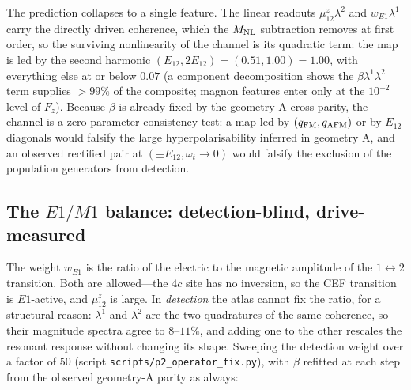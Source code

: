 \documentclass[11pt]{article}
\newcommand{\qafm}{q_{\rm AFM}}
\newcommand{\qfm}{q_{\rm FM}}
\newcommand{\Mnl}{M_{\rm NL}}
\begin{document}
The prediction collapses to a single feature.  The linear readouts
$\mu^z_{12}\lambda^2$ and $w_{E1}\lambda^1$ carry the directly driven
coherence, which the $\Mnl$ subtraction removes at first order, so the
surviving nonlinearity of the channel is its quadratic term: the map is
led by the second harmonic $(E_{12},2E_{12})=(0.51,1.00)=1.00$, with
everything else at or below $0.07$ (a component decomposition shows the
$\beta\lambda^1\lambda^2$ term supplies $>\!99\%$ of the composite;
magnon features enter only at the $10^{-2}$ level of $F_z$).  Because
$\beta$ is already fixed by the geometry-A cross parity, the channel is
a zero-parameter consistency test: a map led by $(\qfm,\qafm)$ or by
$E_{12}$ diagonals would falsify the large hyperpolarisability inferred
in geometry A, and an observed rectified pair at
$(\pm E_{12},\omega_t\!\to\!0)$ would falsify the exclusion of the
population generators from detection.

\subsection{The $E1/M1$ balance: detection-blind, drive-measured}
\label{si:e1m1}

The weight $w_{E1}$ is the ratio of the electric to the magnetic
amplitude of the $1\!\leftrightarrow\!2$ transition.  Both are
allowed---the $4c$ site has no inversion, so the CEF transition is
$E1$-active, and $\mu^z_{12}$ is large.  In \emph{detection} the atlas
cannot fix the ratio, for a structural reason: $\lambda^1$ and
$\lambda^2$ are the two quadratures of the same coherence, so their
magnitude spectra agree to $8$--$11\%$, and adding one to the other
rescales the resonant response without changing its shape.  Sweeping
the detection weight over a factor of $50$ (script
\texttt{scripts/p2\_operator\_fix.py}), with $\beta$ refitted at each
step from the observed geometry-A parity as always:
\end{document}
